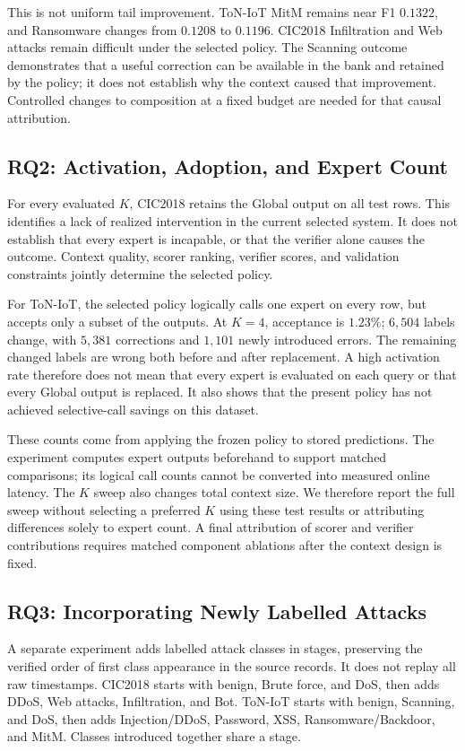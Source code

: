 \documentclass[sigconf,anonymous,pbalance]{acmart}
\begin{document}
This is not uniform tail improvement. ToN-IoT MitM remains near F1 $0.1322$, and Ransomware changes from $0.1208$ to $0.1196$. CIC2018 Infiltration and Web attacks remain difficult under the selected policy. The Scanning outcome demonstrates that a useful correction can be available in the bank and retained by the policy; it does not establish why the context caused that improvement. Controlled changes to composition at a fixed budget are needed for that causal attribution.

\subsection{RQ2: Activation, Adoption, and Expert Count}

For every evaluated $K$, CIC2018 retains the Global output on all test rows. This identifies a lack of realized intervention in the current selected system. It does not establish that every expert is incapable, or that the verifier alone causes the outcome. Context quality, scorer ranking, verifier scores, and validation constraints jointly determine the selected policy.

For ToN-IoT, the selected policy logically calls one expert on every row, but accepts only a subset of the outputs. At $K=4$, acceptance is $1.23\%$; $6{,}504$ labels change, with $5{,}381$ corrections and $1{,}101$ newly introduced errors. The remaining changed labels are wrong both before and after replacement. A high activation rate therefore does not mean that every expert is evaluated on each query or that every Global output is replaced. It also shows that the present policy has not achieved selective-call savings on this dataset.

These counts come from applying the frozen policy to stored predictions. The experiment computes expert outputs beforehand to support matched comparisons; its logical call counts cannot be converted into measured online latency. The $K$ sweep also changes total context size. We therefore report the full sweep without selecting a preferred $K$ using these test results or attributing differences solely to expert count. A final attribution of scorer and verifier contributions requires matched component ablations after the context design is fixed.

\subsection{RQ3: Incorporating Newly Labelled Attacks}
\label{sec:arrival}
A separate experiment adds labelled attack classes in stages, preserving the verified order of first class appearance in the source records. It does not replay all raw timestamps. CIC2018 starts with benign, Brute force, and DoS, then adds DDoS, Web attacks, Infiltration, and Bot. ToN-IoT starts with benign, Scanning, and DoS, then adds Injection/DDoS, Password, XSS, Ransomware/Backdoor, and MitM. Classes introduced together share a stage.
\end{document}
